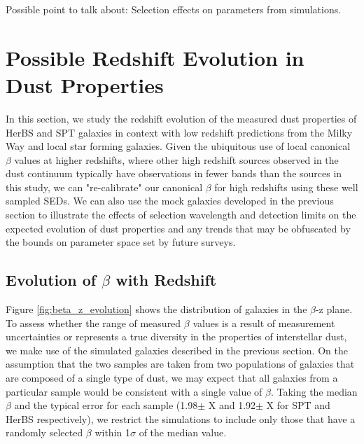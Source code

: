 {\color{red} Possible point to talk about: Selection effects on parameters from simulations.}

\section{Possible Redshift Evolution in Dust Properties}
\label{sec:redshift_evolution}

In this section, we study the redshift evolution of the measured dust properties of HerBS and SPT galaxies in context with low redshift predictions from the Milky Way and local star forming galaxies. Given the ubiquitous use of local canonical $\beta$ values at higher redshifts, where other high redshift sources observed in the dust continuum typically have observations in fewer bands than the sources in this study, we can "re-calibrate" our canonical $\beta$ for high redshifts using these well sampled SEDs. We can also use the mock galaxies developed in the previous section to illustrate the effects of selection wavelength and detection limits on the expected evolution of dust properties and any trends that may be obfuscated by the bounds on parameter space set by future surveys. 

\subsection{Evolution of $\beta$ with Redshift}

Figure \ref{fig:beta_z_evolution} shows the distribution of galaxies in the $\beta$-z plane. To assess whether the range of measured $\beta$ values is a result of measurement uncertainties or represents a true diversity in the properties of interstellar dust, we make use of the simulated galaxies described in the previous section. On the assumption that the two samples are taken from two populations of galaxies that are composed of a single type of dust, we may expect that all galaxies from a particular sample would be consistent with a single value of $\beta$. Taking the median $\beta$ and the typical error for each sample (1.98$\pm${\color{red} X} and 1.92$\pm${\color{red} X} for SPT and HerBS respectively), we restrict the simulations to include only those that have a randomly selected $\beta$ within 1$\sigma$ of the median value. 

